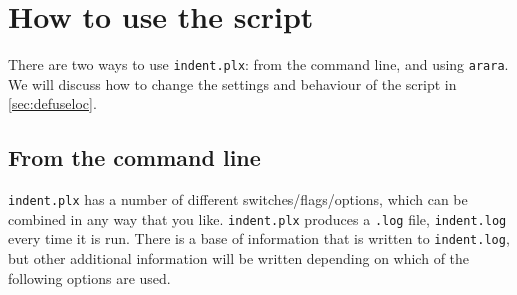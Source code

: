 \documentclass[11pt]{article}
\begin{document}
\section{How to use the script}
There are two ways to use \lstinline!indent.plx!: from the command line, 
and using \lstinline!arara!.  We will discuss how to change the settings and behaviour 
of the script in \cref{sec:defuseloc}.

\subsection{From the command line}\label{sec:commandline}
\lstinline!indent.plx! has a number of different switches/flags/options, which 
can be combined in any way that you like. \lstinline!indent.plx! 
produces a \lstinline!.log! file, \lstinline!indent.log! every time it
is run. There is a base of information that is written to \lstinline!indent.log!,
but other additional information will be written depending 
on which of the following options are used.
\end{document}
